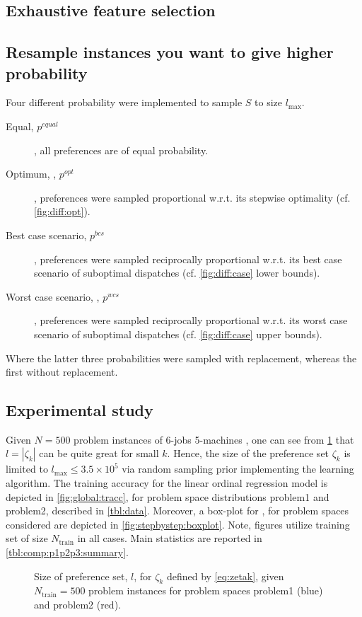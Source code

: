 \subsection{Exhaustive feature selection}

\subsection{Resample instances you want to give higher probability}
Four different probability were implemented to sample $S$ to size $l_{\max}$. 
\begin{description}
	\item[Equal, $p^{equal}$], all preferences are of equal probability.
	\item[Optimum, , $p^{opt}$], preferences were sampled proportional w.r.t. its stepwise optimality (cf. \cref{fig:diff:opt}).
	\item[Best case scenario, $p^{bcs}$], preferences were sampled reciprocally proportional w.r.t. its best case scenario of suboptimal dispatches (cf. \cref{fig:diff:case} lower bounds).
	\item[Worst case scenario, , $p^{wcs}$], preferences were sampled reciprocally proportional w.r.t. its worst case scenario of suboptimal dispatches (cf. \cref{fig:diff:case} upper bounds).
\end{description}
Where the latter three probabilities were sampled with replacement, whereas the first without replacement.


\subsection{Experimental study}\label{sec:global}
Given $N=500$ problem instances of 6-jobs 5-machines \jsp, one can see from \cref{fig:global:sizeofprefset} that $l=|\zeta_k|$ can be quite great for small $k$. Hence, the size of the preference set $\zeta_k$ is limited to $l_{\max}\leq 3.5\times10^{5}$ via random sampling prior implementing the learning algorithm. The training accuracy for the linear ordinal regression model is depicted in \cref{fig:global:tracc}, for problem space distributions problem{1} and problem{2}, described in \cref{tbl:data}.
Moreover, a box-plot for \fullnamerho, for problem spaces considered are depicted in  \cref{fig:stepbystep:boxplot}. Note, figures utilize training set of size $N_{\text{train}}$ in all cases. Main statistics are reported in \cref{tbl:comp:p1p2p3:summary}. 

\begin{figure}\centering 
\caption{Size of preference set, $l$, for $\zeta_k$ defined by \cref{eq:zetak}, given $N_{\text{train}}=500$ problem instances for problem spaces problem{1} (blue) and problem{2} (red).}
\label{fig:global:sizeofprefset}
\end{figure}

